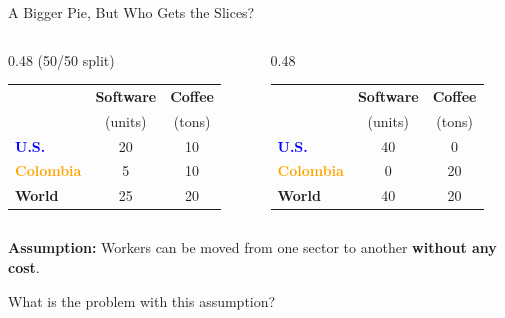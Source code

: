 \documentclass[9pt,english,aspectratio=169]{beamer}
\begin{document}
\begin{frame}{A Bigger Pie, But Who Gets the Slices?}

  \begin{columns}[T]
    \begin{column}{0.48\textwidth}
       {\small (50/50 split)}

      \vspace{0.8em}
      \centering
      \begin{tabular}{@{} l c c @{}}
        \toprule
        & \textbf{Software} & \textbf{Coffee} \\
        & (units) & (tons) \\
        \midrule
        \textcolor{blue}{\textbf{U.S.}} & 20 & 10 \\
        \textcolor{orange}{\textbf{Colombia}} & 5 & 10 \\
        \midrule
        \textbf{World} & 25 & 20 \\
        \bottomrule
      \end{tabular}
    \end{column}
    \begin{column}{0.48\textwidth}

      \vspace{0.8em}
      \centering
      \begin{tabular}{@{} l c c @{}}
        \toprule
        & \textbf{Software} & \textbf{Coffee} \\
        & (units) & (tons) \\
        \midrule
        \textcolor{blue}{\textbf{U.S.}} & 40 & 0 \\
        \textcolor{orange}{\textbf{Colombia}} & 0 & 20 \\
        \midrule
        \textbf{World} & 40 & 20 \\
        \bottomrule
      \end{tabular}
    \end{column}
  \end{columns}

  \vspace{1em}
  \textbf{Assumption:} Workers can be moved from one sector to another \textbf{without any cost}.

  \pause
  \begin{questionbox}
    What is the problem with this assumption?
  \end{questionbox}

\end{frame}
\end{document}
